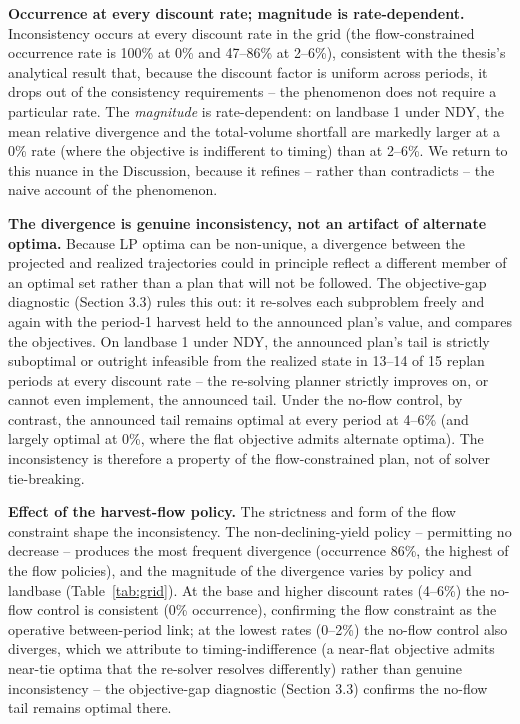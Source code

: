 \textbf{Occurrence at every discount rate; magnitude is rate-dependent.} Inconsistency occurs at every discount rate in the grid (the flow-constrained occurrence rate is 100\% at 0\% and 47--86\% at 2--6\%), consistent with the thesis's analytical result that, because the discount factor is uniform across periods, it drops out of the consistency requirements \citep[ch.~3, p.~58--59]{daugherty1991credibility} -- the phenomenon does not require a particular rate. The \emph{magnitude} is rate-dependent: on landbase 1 under NDY, the mean relative divergence and the total-volume shortfall are markedly larger at a 0\% rate (where the objective is indifferent to timing) than at 2--6\%. We return to this nuance in the Discussion, because it refines -- rather than contradicts -- the naive account of the phenomenon.

\textbf{The divergence is genuine inconsistency, not an artifact of alternate optima.} Because LP optima can be non-unique, a divergence between the projected and realized trajectories could in principle reflect a different member of an optimal set rather than a plan that will not be followed. The objective-gap diagnostic (Section 3.3) rules this out: it re-solves each subproblem freely and again with the period-1 harvest held to the announced plan's value, and compares the objectives. On landbase 1 under NDY, the announced plan's tail is strictly suboptimal or outright infeasible from the realized state in 13--14 of 15 replan periods at every discount rate -- the re-solving planner strictly improves on, or cannot even implement, the announced tail. Under the no-flow control, by contrast, the announced tail remains optimal at every period at 4--6\% (and largely optimal at 0\%, where the flat objective admits alternate optima). The inconsistency is therefore a property of the flow-constrained plan, not of solver tie-breaking.

\textbf{Effect of the harvest-flow policy.} The strictness and form of the flow constraint shape the inconsistency. The non-declining-yield policy -- permitting no decrease -- produces the most frequent divergence (occurrence 86\%, the highest of the flow policies), and the magnitude of the divergence varies by policy and landbase (Table~\ref{tab:grid}). At the base and higher discount rates (4--6\%) the no-flow control is consistent (0\% occurrence), confirming the flow constraint as the operative between-period link; at the lowest rates (0--2\%) the no-flow control also diverges, which we attribute to timing-indifference (a near-flat objective admits near-tie optima that the re-solver resolves differently) rather than genuine inconsistency -- the objective-gap diagnostic (Section 3.3) confirms the no-flow tail remains optimal there.


